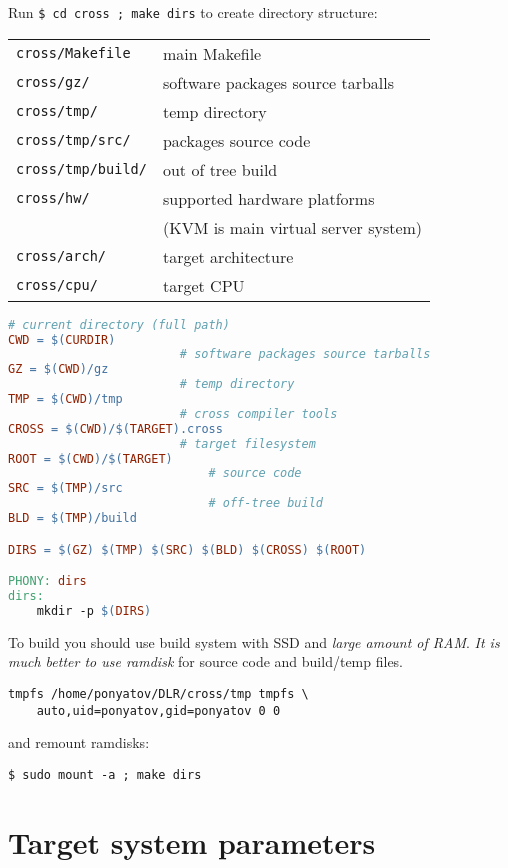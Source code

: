 Run \verb|$ cd cross ; make dirs| to create directory structure:

\bigskip
\begin{tabular}{l l}
\verb|cross/Makefile| & main Makefile \\
\verb|cross/gz/| & software packages source tarballs \\
\verb|cross/tmp/| & temp directory \\
\verb|cross/tmp/src/| & packages source code \\
\verb|cross/tmp/build/| & out of tree build \\
\verb|cross/hw/| & supported hardware platforms\\
				&(KVM is main virtual server system)\\
\verb|cross/arch/| & target architecture\\
\verb|cross/cpu/| & target CPU\\
\end{tabular}

\clearpage

\begin{lstlisting}[language=make]
						# current directory (full path)
CWD = $(CURDIR)
						# software packages source tarballs
GZ = $(CWD)/gz
						# temp directory
TMP = $(CWD)/tmp
						# cross compiler tools						
CROSS = $(CWD)/$(TARGET).cross
						# target filesystem
ROOT = $(CWD)/$(TARGET)
							# source code
SRC = $(TMP)/src
							# off-tree build
BLD = $(TMP)/build

DIRS = $(GZ) $(TMP) $(SRC) $(BLD) $(CROSS) $(ROOT)

PHONY: dirs
dirs:
	mkdir -p $(DIRS)
\end{lstlisting}

To build you should use build system with SSD and \emph{large amount of RAM}.
\emph{It is much better to use ramdisk} for source code and build/temp files.

\begin{lstlisting}[title=add this to /etc/fstab (change to your home/gid/uid)]
tmpfs /home/ponyatov/DLR/cross/tmp tmpfs \
	auto,uid=ponyatov,gid=ponyatov 0 0
\end{lstlisting}
and remount ramdisks:
\begin{lstlisting}
$ sudo mount -a ; make dirs
\end{lstlisting}

\clearpage
\section{Target system parameters}


